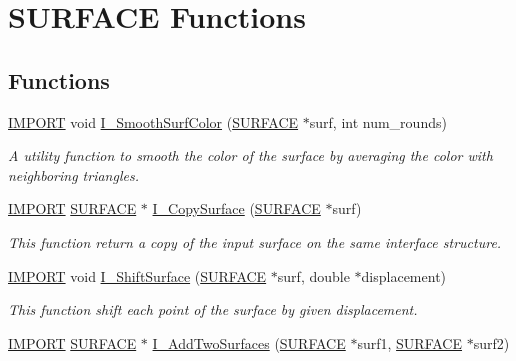 \hypertarget{group___s_u_r_f_a_c_e}{}\section{S\+U\+R\+F\+A\+CE Functions}
\label{group___s_u_r_f_a_c_e}
\subsection*{Functions}
\begin{DoxyCompactItemize}
\item 
\hyperlink{cdecs_8h_a773175d74e73776d69c3e538f17de1ee}{I\+M\+P\+O\+RT} void \hyperlink{group___s_u_r_f_a_c_e_gace258538e7976901cedcbff9bda2bc67}{I\+\_\+\+Smooth\+Surf\+Color} (\hyperlink{int_8h_a1520d8870b5eafd76bd401aecb121ffd}{S\+U\+R\+F\+A\+CE} $\ast$surf, int num\+\_\+rounds)
\begin{DoxyCompactList}\small\item\em A utility function to smooth the color of the surface by averaging the color with neighboring triangles. \end{DoxyCompactList}\item 
\hyperlink{cdecs_8h_a773175d74e73776d69c3e538f17de1ee}{I\+M\+P\+O\+RT} \hyperlink{int_8h_a1520d8870b5eafd76bd401aecb121ffd}{S\+U\+R\+F\+A\+CE} $\ast$ \hyperlink{group___s_u_r_f_a_c_e_ga495b2ece6a428d98433c026382353773}{I\+\_\+\+Copy\+Surface} (\hyperlink{int_8h_a1520d8870b5eafd76bd401aecb121ffd}{S\+U\+R\+F\+A\+CE} $\ast$surf)
\begin{DoxyCompactList}\small\item\em This function return a copy of the input surface on the same interface structure. \end{DoxyCompactList}\item 
\hyperlink{cdecs_8h_a773175d74e73776d69c3e538f17de1ee}{I\+M\+P\+O\+RT} void \hyperlink{group___s_u_r_f_a_c_e_ga8d40b24606a741760d312b558d866511}{I\+\_\+\+Shift\+Surface} (\hyperlink{int_8h_a1520d8870b5eafd76bd401aecb121ffd}{S\+U\+R\+F\+A\+CE} $\ast$surf, double $\ast$displacement)
\begin{DoxyCompactList}\small\item\em This function shift each point of the surface by given displacement. \end{DoxyCompactList}\item 
\hyperlink{cdecs_8h_a773175d74e73776d69c3e538f17de1ee}{I\+M\+P\+O\+RT} \hyperlink{int_8h_a1520d8870b5eafd76bd401aecb121ffd}{S\+U\+R\+F\+A\+CE} $\ast$ \hyperlink{group___s_u_r_f_a_c_e_ga6eaa182acdbd072af3d7487eb0117f33}{I\+\_\+\+Add\+Two\+Surfaces} (\hyperlink{int_8h_a1520d8870b5eafd76bd401aecb121ffd}{S\+U\+R\+F\+A\+CE} $\ast$surf1, \hyperlink{int_8h_a1520d8870b5eafd76bd401aecb121ffd}{S\+U\+R\+F\+A\+CE} $\ast$surf2)

\end{DoxyCompactItemize}
